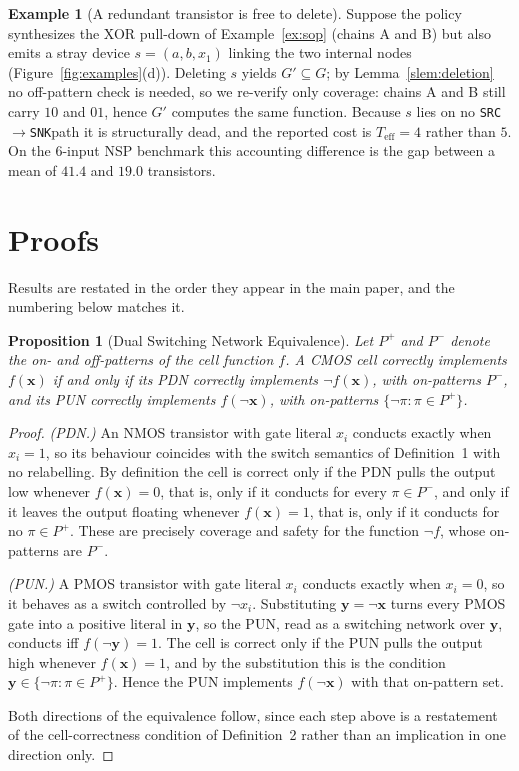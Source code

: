 \documentclass[letterpaper]{article}
\theoremstyle{plain}
\newtheorem{proposition}[theorem]{Proposition}
\theoremstyle{definition}
\newtheorem{example}{Example}
\newcommand{\SRC}{\texttt{SRC}}
\newcommand{\SNK}{\texttt{SNK}}
\newcommand{\Pon}{P^{+}}
\newcommand{\Poff}{P^{-}}
\begin{document}
\begin{example}[A redundant transistor is free to delete]
\label{ex:reduction}
Suppose the policy synthesizes the XOR pull-down of Example~\ref{ex:sop}
(chains A and B) but also emits a stray device $s=(a,b,x_1)$ linking the two
internal nodes (Figure~\ref{fig:examples}(d)).
Deleting $s$ yields $G'\subseteq G$; by Lemma~\ref{slem:deletion} no
off-pattern check is needed, so we re-verify only coverage: chains A and B
still carry $10$ and $01$, hence $G'$ computes the same function.
Because $s$ lies on no \SRC$\to$\SNK path it is structurally dead, and the
reported cost is $T_{\mathrm{eff}}=4$ rather than $5$.
On the $6$-input NSP benchmark this accounting difference is the gap between a
mean of $41.4$ and $19.0$ transistors.
\end{example}

\section{Proofs}
\label{app:proofs}

\noindent Results are restated in the order they appear in the main paper, and
the numbering below matches it.

\begin{proposition}[Dual Switching Network Equivalence]
\label{sprop:dual}
Let $\Pon$ and $\Poff$ denote the on- and off-patterns of the cell function
$f$.
A CMOS cell correctly implements $f(\mathbf{x})$ if and only if its PDN
correctly implements $\lnot f(\mathbf{x})$, with on-patterns $\Poff$, and its
PUN correctly implements $f(\lnot\mathbf{x})$, with on-patterns
$\{\lnot\pi : \pi \in \Pon\}$.
\end{proposition}
\begin{proof}
\textit{(PDN.)}
An NMOS transistor with gate literal $x_i$ conducts exactly when $x_i = 1$, so
its behaviour coincides with the switch semantics of Definition~1 with no
relabelling.
By definition the cell is correct only if the PDN pulls the output low
whenever $f(\mathbf{x}) = 0$, that is, only if it conducts for every
$\pi \in \Poff$, and only if it leaves the output floating whenever
$f(\mathbf{x}) = 1$, that is, only if it conducts for no $\pi \in \Pon$.
These are precisely coverage and safety for the function $\lnot f$, whose
on-patterns are $\Poff$.

\textit{(PUN.)}
A PMOS transistor with gate literal $x_i$ conducts exactly when $x_i = 0$, so
it behaves as a switch controlled by $\lnot x_i$.
Substituting $\mathbf{y} = \lnot\mathbf{x}$ turns every PMOS gate into a
positive literal in $\mathbf{y}$, so the PUN, read as a switching network over
$\mathbf{y}$, conducts iff $f(\lnot\mathbf{y}) = 1$.
The cell is correct only if the PUN pulls the output high whenever
$f(\mathbf{x}) = 1$, and by the substitution this is the condition
$\mathbf{y} \in \{\lnot\pi : \pi \in \Pon\}$.
Hence the PUN implements $f(\lnot\mathbf{x})$ with that on-pattern set.

Both directions of the equivalence follow, since each step above is a
restatement of the cell-correctness condition of Definition~2 rather than an
implication in one direction only.
\end{proof}
\end{document}
